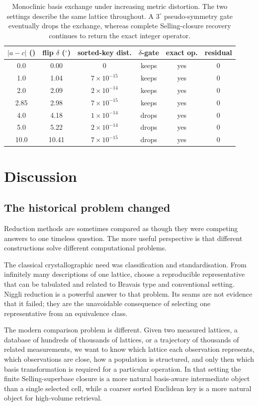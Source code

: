 \documentclass[11pt]{article}
\newcommand{\Ang}{\text{\AA}}
\begin{document}
\begin{table}[t]
\centering
\caption{Monoclinic basis exchange under increasing metric distortion. The two settings describe the same lattice throughout. A $3^\circ$ pseudo-symmetry gate eventually drops the exchange, whereas complete Selling-closure recovery continues to return the exact integer operator.}
\begin{tabular}{cccccc}
\toprule
$|a-c|$ (\Ang) & flip $\delta$ ($^\circ$) & sorted-key dist. & $\delta$-gate & exact op. & residual \\
\midrule
0.0  & 0.00  & $0$ & keeps & yes & $0$ \\
1.0  & 1.04  & $7\times10^{-15}$ & keeps & yes & $0$ \\
2.0  & 2.09  & $2\times10^{-14}$ & keeps & yes & $0$ \\
2.85 & 2.98  & $7\times10^{-15}$ & keeps & yes & $0$ \\
4.0  & 4.18  & $1\times10^{-14}$ & drops & yes & $0$ \\
5.0  & 5.22  & $2\times10^{-14}$ & drops & yes & $0$ \\
10.0 & 10.41 & $7\times10^{-15}$ & drops & yes & $0$ \\
\bottomrule
\end{tabular}
\end{table}

\section{Discussion}

\subsection{The historical problem changed}

Reduction methods are sometimes compared as though they were competing answers to one timeless question. The more useful perspective is that different constructions solve different computational problems.

The classical crystallographic need was classification and standardisation. From infinitely many descriptions of one lattice, choose a reproducible representative that can be tabulated and related to Bravais type and conventional setting. Niggli reduction is a powerful answer to that problem. Its seams are not evidence that it failed; they are the unavoidable consequence of selecting one representative from an equivalence class.

The modern comparison problem is different. Given two measured lattices, a database of hundreds of thousands of lattices, or a trajectory of thousands of related measurements, we want to know which lattice each observation represents, which observations are close, how a population is structured, and only then which basis transformation is required for a particular operation. In that setting the finite Selling-superbase closure is a more natural basis-aware intermediate object than a single selected cell, while a coarser sorted Euclidean key is a more natural object for high-volume retrieval.
\end{document}

